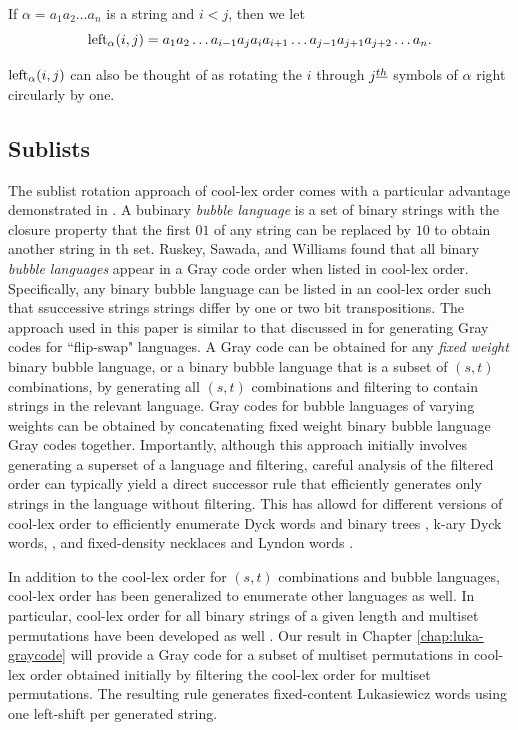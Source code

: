 If $\alpha = a_1 a_2 \ldots a_n$ is a string and $i < j$, then we let
\begin{equation}
    \lshiftindex[\alpha]{i}{j} = a_1 a_2 \ldots a_{i-1} a_j a_{i} a_{i+1} \ldots a_{j-1} a_{j+1} a_{j+2} \ldots a_n. \label{eq:leftdef}
\end{equation}

$\lshiftindex[\alpha]{i}{j}$ can also be thought of as rotating the $i$ through $j\thh$ symbols of $\alpha$ right circularly by one.

\subsection{Sublists}
The sublist rotation approach of cool-lex order comes with a particular advantage demonstrated in \cite{ruskey2012binary}. A bubinary \emph{bubble language} is a set of binary strings with the closure property that the first $01$ of any string can be replaced by $10$ to obtain another string in th set.  Ruskey, Sawada, and Williams found that all binary \emph{bubble languages} appear in a Gray code order when listed in cool-lex order.  Specifically, any binary bubble language can be listed in an cool-lex order such that ssuccessive strings strings differ by one or two bit transpositions.  The approach used in this paper is similar to that discussed in \cite{sawada2021inside} for generating Gray codes for ``flip-swap" languages.  A Gray code can be obtained for any \emph{fixed weight} binary bubble language, or a binary bubble language that is a subset of $(s,t)$ combinations, by generating all $(s,t)$ combinations and filtering to contain strings in the relevant language.  Gray codes for bubble languages of varying weights can be obtained by concatenating fixed weight binary bubble language Gray codes together.
Importantly, although this approach initially involves generating a superset of a language and filtering, careful analysis of the filtered order can typically yield a direct successor rule that efficiently generates only strings in the language without filtering.  This has allowd for different versions of cool-lex order to efficiently enumerate Dyck words and binary trees \cite{ruskey2008generating}, k-ary Dyck words, \cite{durocher2012cool}, and fixed-density necklaces and Lyndon words \cite{sawada2009fixed}.  

In addition to the cool-lex order for $(s,t)$ combinations and bubble languages, cool-lex order has been generalized to enumerate other languages as well.  In particular, cool-lex order for all binary strings of a given length and multiset permutations have been developed as well \cite{williams2009loopless}.  Our result in Chapter \ref{chap:luka-graycode} will provide a Gray code for a subset of multiset permutations in cool-lex order obtained initially by filtering the cool-lex order for multiset permutations.  The resulting rule generates fixed-content Lukasiewicz words using one left-shift per generated string.


